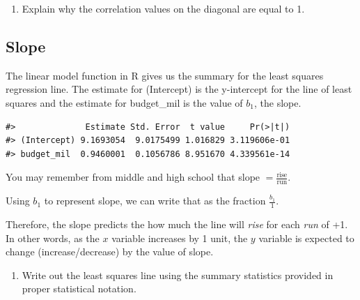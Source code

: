 \documentclass[
]{report}
\newenvironment{Shaded}{\begin{snugshade}}{\end{snugshade}}
\newcommand{\CommentTok}[1]{\textcolor[rgb]{0.56,0.35,0.01}{\textit{#1}}}
\newcommand{\DataTypeTok}[1]{\textcolor[rgb]{0.13,0.29,0.53}{#1}}
\newcommand{\KeywordTok}[1]{\textcolor[rgb]{0.13,0.29,0.53}{\textbf{#1}}}
\newcommand{\NormalTok}[1]{#1}
\newcommand{\OperatorTok}[1]{\textcolor[rgb]{0.81,0.36,0.00}{\textbf{#1}}}
\newcommand{\StringTok}[1]{\textcolor[rgb]{0.31,0.60,0.02}{#1}}
\providecommand{\tightlist}{%
  \setlength{\itemsep}{0pt}\setlength{\parskip}{0pt}}
\begin{document}
\begin{enumerate}
\def\labelenumi{\arabic{enumi}.}
\setcounter{enumi}{8}
\tightlist
\item
  Explain why the correlation values on the diagonal are equal to 1.
\end{enumerate}

\vspace{1in}

\newpage

\hypertarget{slope}{%
\subsection*{Slope}\label{slope}}

The linear model function in R gives us the summary for the least squares regression line. The estimate for (Intercept) is the y-intercept for the line of least squares and the estimate for budget\_mil is the value of \(b_1\), the slope.

\begin{Shaded}
\end{Shaded}

\begin{verbatim}
#>              Estimate Std. Error  t value     Pr(>|t|)
#> (Intercept) 9.1693054  9.0175499 1.016829 3.119606e-01
#> budget_mil  0.9460001  0.1056786 8.951670 4.339561e-14
\end{verbatim}

You may remember from middle and high school that slope \(=\frac{\mbox{rise}}{\mbox{run}}\).

Using \(b_1\) to represent slope, we can write that as the fraction \(\frac{b_1}{1}\).

Therefore, the slope predicts the how much the line will \emph{rise} for each \emph{run} of +1. In other words, as the \(x\) variable increases by 1 unit, the \(y\) variable is expected to change (increase/decrease) by the value of slope.

\begin{enumerate}
\def\labelenumi{\arabic{enumi}.}
\setcounter{enumi}{9}
\tightlist
\item
  Write out the least squares line using the summary statistics provided in proper statistical notation.
\end{enumerate}
\end{document}
